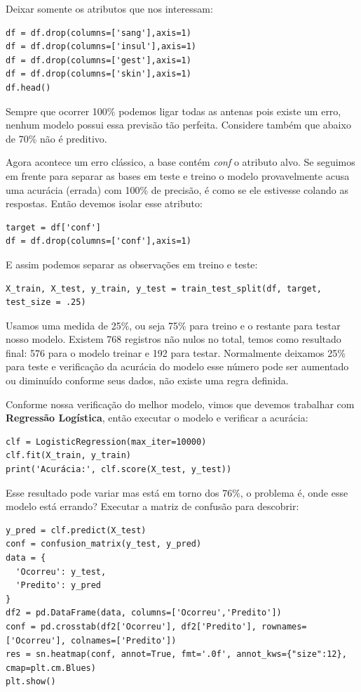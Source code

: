 Deixar somente os atributos que nos interessam:
\begin{lstlisting}[]
df = df.drop(columns=['sang'],axis=1)
df = df.drop(columns=['insul'],axis=1)
df = df.drop(columns=['gest'],axis=1)
df = df.drop(columns=['skin'],axis=1)
df.head()
\end{lstlisting}

\begin{note}[100\% de Precisão] 
	Sempre que ocorrer 100\% podemos ligar todas as antenas pois existe um erro, nenhum modelo possui essa previsão tão perfeita. Considere também que abaixo de 70\% não é preditivo.
\end{note}

Agora acontece um erro clássico, a base contém \textit{conf} o atributo alvo. Se seguimos em frente para separar as bases em teste e treino o modelo provavelmente acusa uma acurácia (errada) com 100\% de precisão, é como se ele estivesse colando as respostas. Então devemos isolar esse atributo: 
\begin{lstlisting}[]
target = df['conf']
df = df.drop(columns=['conf'],axis=1)
\end{lstlisting}

E assim podemos separar as observações em treino e teste:
\begin{lstlisting}[]
X_train, X_test, y_train, y_test = train_test_split(df, target, test_size = .25)
\end{lstlisting}

Usamos uma medida de 25\%, ou seja 75\% para treino e o restante para testar nosso modelo. Existem 768 registros não nulos no total, temos como resultado final: 576 para o modelo treinar e 192 para testar. Normalmente deixamos 25\% para teste e verificação da acurácia do modelo esse número pode ser aumentado ou diminuído conforme seus dados, não existe uma regra definida.

Conforme nossa verificação do melhor modelo, vimos que devemos trabalhar com \textbf{Regressão Logística}, então executar o modelo e verificar a acurácia:
\begin{lstlisting}[]
clf = LogisticRegression(max_iter=10000)
clf.fit(X_train, y_train)
print('Acurácia:', clf.score(X_test, y_test))
\end{lstlisting}

Esse resultado pode variar mas está em torno dos 76\%, o problema é, onde esse modelo está errando? Executar a matriz de confusão para descobrir:
\begin{lstlisting}[]
y_pred = clf.predict(X_test)
conf = confusion_matrix(y_test, y_pred)
data = {
  'Ocorreu': y_test,
  'Predito': y_pred
}
df2 = pd.DataFrame(data, columns=['Ocorreu','Predito'])
conf = pd.crosstab(df2['Ocorreu'], df2['Predito'], rownames=['Ocorreu'], colnames=['Predito'])
res = sn.heatmap(conf, annot=True, fmt='.0f', annot_kws={"size":12}, cmap=plt.cm.Blues)
plt.show()
\end{lstlisting}

